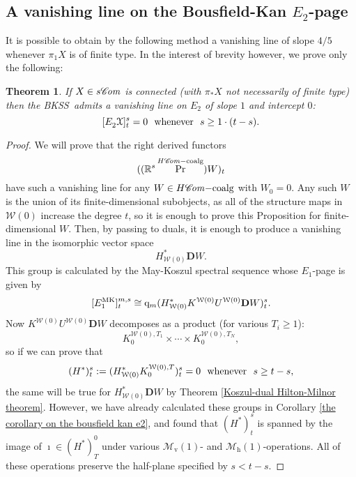 \documentclass[11pt]{amsart} \renewcommand{\baselinestretch}{1.2}
\theoremstyle{plain}
\newtheorem{thm}{Theorem}[section] %
\numberwithin{equation}{section} %
\theoremstyle{plain}
\newtheorem{thm}{Theorem}[chapter] %
\numberwithin{equation}{chapter} %
\DeclareMathOperator{\Prim}{Pr}
\newcommand{\scrC}{\mathscr{C}}
\newcommand{\calX}{\mathcal{X}}
\newcommand{\calw}{\mathcal{W}}
\newcommand{\calx}{\mathcal{X}}
\newcommand{\calMv}{\mathcal{M}\dver}
\newcommand{\calMh}{\mathcal{M}\dhor}
\newcommand{\HC}[1]{H#1\mathrm{-coalg}}
\newcommand{\quadgrad}[1]{\mathrm{q}_{#1}}
\newcommand{\algs}{{\scrC\!\textit{\normalfont\textit{om}}}}
\newcommand{\E}[5]{[E^{#1}_{#2}#3]^{#4}_{#5}}
\newcommand{\dver}{_\mathrm{v}}
\newcommand{\dhor}{_\mathrm{h}}
\newcommand{\dual}{\mathbf{D}}
\newcommand{\BKSS}{BKSS}
\newcommand{\SubsectionOrSection}[1]{\subsection{#1}}
\begin{document}
\begin{May sseq and vanishing line}
\SubsectionOrSection{A vanishing line on the Bousfield-Kan $E_2$-page}
\label{A vanishing line on the Bousfield-Kan}
It is possible to obtain by the following method a vanishing line of slope $4/5$ whenever $\pi_1X$ is of finite type. In the interest of brevity however, we prove only the following:
\begin{thm}
\label{vanishing line prop}
If $X\in s\algs$ is connected (with $\pi_*X$ not necessarily of finite type) then the \BKSS\ admits a vanishing line on $E_2$ of slope $1$ and intercept $0$:
\[\E{}{2}{\calx}{s}{t}=0\textup{ \ whenever \ }s\geq 1\cdot( t-s).\]
\end{thm}
\begin{proof}
We will prove that the right derived functors
\[((\mathbb{R}^s\Prim^{\HC{\algs}})W)_t\]
have such a vanishing line for any $W\in \HC{\algs}$ with $W_0=0$. Any such $W$ is the union of its finite-dimensional subobjects, as all of the structure maps in $\calw(0)$ increase the degree $t$, so it is enough to prove this Proposition for finite-dimensional $W$. Then, by passing to duals, it is enough to produce a vanishing line in the isomorphic vector space
\[H^*_{\calw(0)}\dual W.\]
This group is calculated by the May-Koszul spectral sequence whose $E_1$-page is given by
\[\E{\textup{MK}}{1}{}{m,s}{t}\cong \quadgrad{m}(H^*_{\calw(0)}K^{\calw(0)}U^{\calw(0)}\dual W)^{s}_{t}.\]
Now $K^{\calw(0)}U^{\calw(0)}\dual W$ decomposes as a product (for various $T_i\geq1$):
\[K_{0}^{\calw(0),T_1}\times\cdots \times K_{0}^{\calw(0),T_N},\]
so if we can prove that
\[(H^*)^s_t:=(H^{*}_{\calw(0)}K_0^{\calw(0),T})^s_t=0 \textup{ \ whenever \ }s\geq t-s,\]
the same will be true for $H^*_{\calw(0)}\dual W$ by Theorem \ref{Koszul-dual Hilton-Milnor theorem}. %
However, we have already calculated these groups in Corollary \ref{the corollary on the bousfield kan e2}, and found that $(H^*)^s_t$ is spanned by the image of $\imath\in (H^*)^0_T$ under various $\calMv(1)$- and $\calMh(1)$-operations. All of these operations preserve the half-plane specified by $s<t-s$.
\end{proof}


\end{May sseq and vanishing line}
\end{document}
